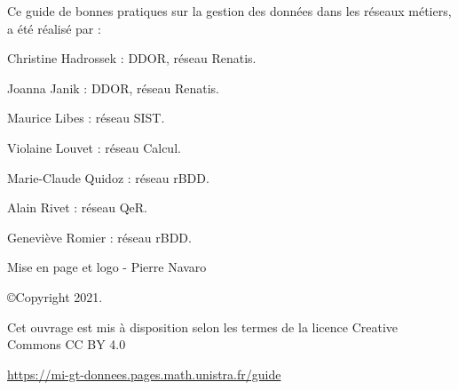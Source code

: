 \vspace*{\fill}
\begingroup

Ce guide de bonnes pratiques sur la gestion des données dans les réseaux métiers, a été réalisé par  :

\begin{list}{-}{}
\item Christine Hadrossek : DDOR, réseau Renatis.
\item Joanna Janik : DDOR, réseau Renatis.
\item Maurice Libes : réseau SIST.
\item Violaine Louvet : réseau Calcul.
\item Marie-Claude Quidoz : réseau rBDD.
\item Alain Rivet : réseau QeR.
\item Geneviève Romier : réseau rBDD.
\end{list}

Mise en page et logo - Pierre Navaro

\copyright Copyright 2021.

Cet ouvrage est mis à disposition selon les termes de la licence Creative Commons CC BY 4.0 \ccby

\url{https://mi-gt-donnees.pages.math.unistra.fr/guide}

\endgroup

\vspace*{\fill}
\clearpage
